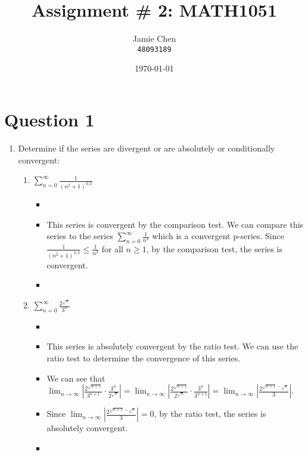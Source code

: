 \documentclass[12pt]{article}
\title{Assignment \# 2: MATH1051}
\author{Jamie Chen\\ \text{Student Number:} \texttt{48093189} \\ \text{Semester 2, 2023}}
\date{\today}
\begin{document}
\maketitle
\section*{Question 1}
\begin{enumerate}[leftmargin=\labelsep]
    \item Determine if the series are divergent or are absolutely or conditionally convergent:


    \begin{enumerate}
        \item $\displaystyle{\sum_{n=0}^{\infty} \frac{1}{({n^2+1})^{3/2}}}$
        \begin{itemize}[label={}]
            \item 
            \item This series is convergent by the comparison test. We can compare this series to the series $\displaystyle{\sum_{n=0}^{\infty} \frac{1}{n^3}}$ which is a convergent p-series. Since $\displaystyle{\frac{1}{({n^2+1})^{3/2}} \leq \frac{1}{n^3}}$ for all $n \geq 1$, by the comparison test, the series is convergent.
            \item 
        \end{itemize}


        \item $\displaystyle{\sum_{n=0}^{\infty} \frac{2^{\sqrt{n}}}{3^n}}$
        \begin{itemize}[label={}]
            \item
            \item This series is absolutely convergent by the ratio test. We can use the ratio test to determine the convergence of this series. 
            \item We can see that $\displaystyle{\lim_{n \to \infty} \left| \frac{2^{\sqrt{n+1}}}{3^{n+1}} \cdot \frac{3^n}{2^{\sqrt{n}}} \right| = \lim_{n \to \infty} \left| \frac{2^{\sqrt{n+1}}}{2^{\sqrt{n}}} \cdot \frac{3^n}{3^{n+1}} \right| = \lim_{n \to \infty} \left| \frac{2^{\sqrt{n+1}-\sqrt{n}}}{3} \right|}$. 
            \item Since $\displaystyle{\lim_{n \to \infty} \left| \frac{2^{\sqrt{n+1}-\sqrt{n}}}{3} \right| = 0}$, by the ratio test, the series is absolutely convergent.
            \item 
        \end{itemize}


\end{enumerate}
\end{enumerate}
\end{document}
